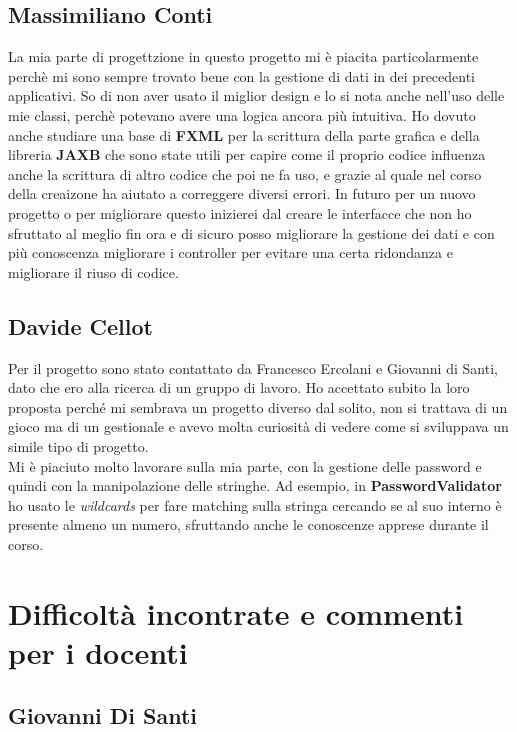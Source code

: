 \documentclass[a4paper,12pt]{report}
\begin{document}
\subsection*{Massimiliano Conti}
La mia parte di progettzione in questo progetto mi è piacita particolarmente perchè mi
sono sempre trovato bene con la gestione di dati in dei precedenti applicativi.
So di non aver usato il miglior design e lo si nota anche nell'uso delle mie classi,
perchè potevano avere una logica ancora più intuitiva.
Ho dovuto anche studiare una base di \textbf{FXML} per la scrittura della parte grafica
e della libreria \textbf{JAXB} che sono state utili per capire come il proprio codice
influenza anche la scrittura di altro codice che poi ne fa uso, e grazie al quale nel
corso della creaizone ha aiutato a correggere diversi errori.
In futuro per un nuovo progetto o per migliorare questo inizierei dal creare le interfacce
che non ho sfruttato al meglio fin ora e di sicuro posso migliorare la gestione dei dati e con
più conoscenza migliorare i controller per evitare una certa ridondanza e
migliorare il riuso di codice.

\subsection*{Davide Cellot}
Per il progetto sono stato contattato da Francesco Ercolani e Giovanni di Santi, dato che ero alla ricerca di un gruppo di lavoro. Ho accettato subito la loro proposta perché mi sembrava un progetto diverso dal solito, non si trattava di un gioco ma di un gestionale e avevo molta curiosità di vedere come si sviluppava un simile tipo di progetto.\\

Mi è piaciuto molto lavorare sulla mia parte, con la gestione delle password e quindi con la manipolazione delle stringhe. Ad esempio, in \textbf{PasswordValidator} ho usato le \textit{wildcards} per fare matching sulla stringa cercando se al suo interno è presente almeno un numero, sfruttando anche le conoscenze apprese durante il corso.


\section{Difficoltà incontrate e commenti per i docenti}

\subsection*{Giovanni Di Santi}
\end{document}
